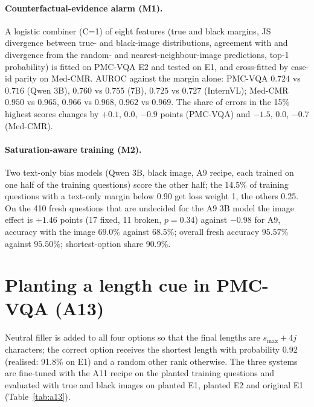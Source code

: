 \paragraph{Counterfactual-evidence alarm (M1).}
A logistic combiner (C=1) of eight features (true and black margins, JS divergence between true- and black-image distributions, agreement with and divergence from the random- and nearest-neighbour-image predictions, top-1 probability) is fitted on PMC-VQA E2 and tested on E1, and cross-fitted by case-id parity on Med-CMR.
AUROC against the margin alone: PMC-VQA $0.724$ vs $0.716$ (Qwen 3B), $0.760$ vs $0.755$ (7B), $0.725$ vs $0.727$ (InternVL); Med-CMR $0.950$ vs $0.965$, $0.966$ vs $0.968$, $0.962$ vs $0.969$.
The share of errors in the 15\% highest scores changes by $+0.1$, $0.0$, $-0.9$ points (PMC-VQA) and $-1.5$, $0.0$, $-0.7$ (Med-CMR).

\paragraph{Saturation-aware training (M2).}
Two text-only bias models (Qwen 3B, black image, A9 recipe, each trained on one half of the training questions) score the other half; the 14.5\% of training questions with a text-only margin below 0.90 get loss weight 1, the others 0.25.
On the 410 fresh questions that are undecided for the A9 3B model the image effect is $+1.46$ points (17 fixed, 11 broken, $p=0.34$) against $-0.98$ for A9, accuracy with the image $69.0\%$ against $68.5\%$; overall fresh accuracy $95.57\%$ against $95.50\%$; shortest-option share 90.9\%.


\section{Planting a length cue in PMC-VQA (A13)}
\label{app:a13}

Neutral filler is added to all four options so that the final lengths are $s_{\max}+4j$ characters; the correct option receives the shortest length with probability 0.92 (realised: 91.8\% on E1) and a random other rank otherwise.
The three systems are fine-tuned with the A11 recipe on the planted training questions and evaluated with true and black images on planted E1, planted E2 and original E1 (Table~\ref{tab:a13}).

